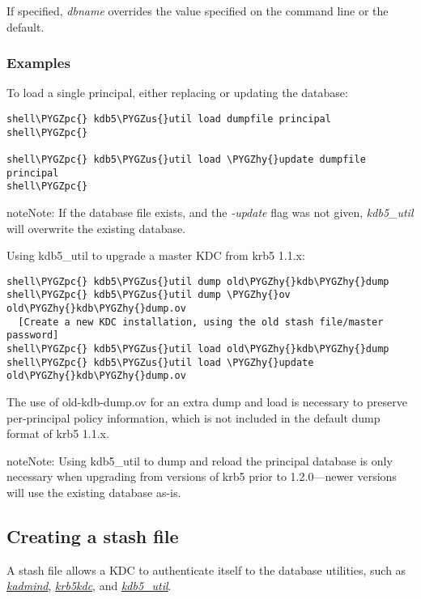 \documentclass[letterpaper,10pt,english]{sphinxmanual}
\def\PYGZus{\char`\_}
\def\PYGZpc{\char`\%}
\def\PYGZhy{\char`\-}
\begin{document}
If specified, \emph{dbname} overrides the value specified on the command
line or the default.


\subsubsection{Examples}
\label{admin/database:id4}
To load a single principal, either replacing or updating the database:

\begin{Verbatim}[commandchars=\\\{\}]
shell\PYGZpc{} kdb5\PYGZus{}util load dumpfile principal
shell\PYGZpc{}

shell\PYGZpc{} kdb5\PYGZus{}util load \PYGZhy{}update dumpfile principal
shell\PYGZpc{}
\end{Verbatim}

\begin{notice}{note}{Note:}
If the database file exists, and the \emph{-update} flag was not
given, \emph{kdb5\_util} will overwrite the existing database.
\end{notice}

Using kdb5\_util to upgrade a master KDC from krb5 1.1.x:

\begin{Verbatim}[commandchars=\\\{\}]
shell\PYGZpc{} kdb5\PYGZus{}util dump old\PYGZhy{}kdb\PYGZhy{}dump
shell\PYGZpc{} kdb5\PYGZus{}util dump \PYGZhy{}ov old\PYGZhy{}kdb\PYGZhy{}dump.ov
  [Create a new KDC installation, using the old stash file/master password]
shell\PYGZpc{} kdb5\PYGZus{}util load old\PYGZhy{}kdb\PYGZhy{}dump
shell\PYGZpc{} kdb5\PYGZus{}util load \PYGZhy{}update old\PYGZhy{}kdb\PYGZhy{}dump.ov
\end{Verbatim}

The use of old-kdb-dump.ov for an extra dump and load is necessary
to preserve per-principal policy information, which is not included in
the default dump format of krb5 1.1.x.

\begin{notice}{note}{Note:}
Using kdb5\_util to dump and reload the principal database is
only necessary when upgrading from versions of krb5 prior
to 1.2.0---newer versions will use the existing database as-is.
\end{notice}


\subsection{Creating a stash file}
\label{admin/database:create-stash}\label{admin/database:creating-a-stash-file}
A stash file allows a KDC to authenticate itself to the database
utilities, such as {\hyperref[admin/admin_commands/kadmind:kadmind-8]{\emph{kadmind}}}, {\hyperref[admin/admin_commands/krb5kdc:krb5kdc-8]{\emph{krb5kdc}}}, and
{\hyperref[admin/admin_commands/kdb5_util:kdb5-util-8]{\emph{kdb5\_util}}}.
\end{document}
